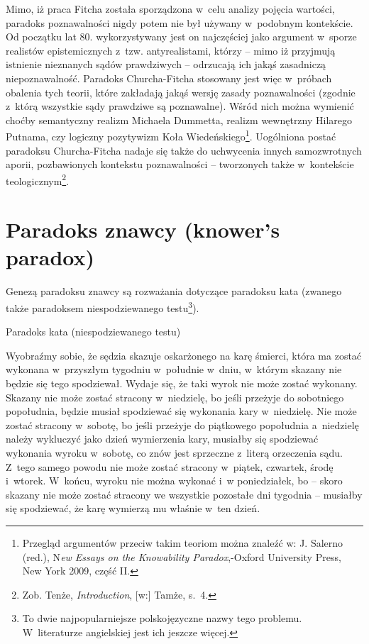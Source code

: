 {Mimo, iż praca Fitcha została sporządzona w~celu analizy pojęcia wartości, paradoks poznawalności nigdy potem nie był używany w~podobnym kontekście. Od początku lat 80. wykorzystywany jest on najczęściej jako argument w~sporze realistów epistemicznych z~tzw. antyrealistami, którzy -- mimo iż przyjmują istnienie nieznanych sądów prawdziwych -- odrzucają ich jakąś zasadniczą niepoznawalność. Paradoks Churcha-Fitcha stosowany jest więc w~próbach obalenia tych teorii, które zakładają jakąś wersję zasady poznawalności (zgodnie z~którą wszystkie sądy prawdziwe są poznawalne). Wśród nich można wymienić choćby semantyczny realizm Michaela Dummetta, realizm wewnętrzny Hilarego Putnama, czy logiczny pozytywizm Koła Wiedeńskiego\footnote{Przegląd argumentów przeciw takim teoriom można znaleźć w: J. Salerno (red.), N\textit{ew Essays on the Knowability Paradox},-Oxford University Press, New York 2009, część II.}. Uogólniona postać paradoksu Churcha-Fitcha nadaje się także do uchwycenia innych samozwrotnych aporii, pozbawionych kontekstu poznawalności -- tworzonych także w~kontekście teologicznym\footnote{Zob. Tenże, \textit{Introduction}, [w:] Tamże, s.~4.}.


\section{Paradoks znawcy (knower's paradox)}

Genezą paradoksu znawcy są rozważania dotyczące paradoksu kata (zwanego także paradoksem niespodziewanego testu\footnote{To dwie najpopularniejsze polskojęzyczne nazwy tego problemu. W~literaturze angielskiej jest ich jeszcze więcej.}).

Paradoks kata (niespodziewanego testu)

Wyobraźmy sobie, że sędzia skazuje oskarżonego na karę śmierci, która ma zostać wykonana w~przyszłym tygodniu w~południe w~dniu, w~którym skazany nie będzie się tego spodziewał. Wydaje się, że taki wyrok nie może zostać wykonany. Skazany nie może zostać stracony w~niedzielę, bo jeśli przeżyje do sobotniego popołudnia, będzie musiał spodziewać się wykonania kary w~niedzielę. Nie może zostać stracony w~sobotę, bo jeśli przeżyje do piątkowego popołudnia a~niedzielę należy wykluczyć jako dzień wymierzenia kary, musiałby się spodziewać wykonania wyroku w~sobotę, co znów jest sprzeczne z~literą orzeczenia sądu. Z~tego samego powodu nie może zostać stracony w~piątek, czwartek, środę i~wtorek. W~końcu, wyroku nie można wykonać i~w poniedziałek, bo -- skoro skazany nie może zostać stracony we wszystkie pozostałe dni tygodnia -- musiałby się spodziewać, że karę wymierzą mu właśnie w~ten dzień.

}
